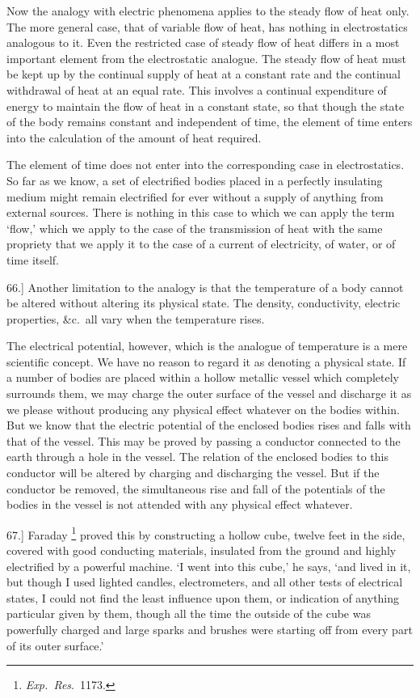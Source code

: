 \documentclass[12pt,oneside]{book}[2021/10/04]
\let\oldfootnote\footnote
\renewcommand\footnote[1]{%
\oldfootnote{\hspace{0.14em}#1}}
\newcommand{\article}[1]{\phantomsection \label{art:#1}{#1.]}}
\newcommand{\¬}{\hphantom{0}}
\begin{document}
Now the analogy with electric phenomena applies to the steady
flow of heat only. The more general case, that of variable flow of
heat, has nothing in electrostatics analogous to it. Even the restricted
case of steady flow of heat differs in a most important
element from the electrostatic analogue. The steady flow of heat
must be kept up by the continual supply of heat at a constant rate
and the continual withdrawal of heat at an equal rate. This involves
a continual expenditure of energy to maintain the flow of
heat in a constant state, so that though the state of the body
remains constant and independent of time, the element of time
enters into the calculation of the amount of heat required.

The element of time does not enter into the corresponding case
in electrostatics. So far as we know, a set of electrified bodies
placed in a perfectly insulating medium might remain electrified
for ever without a supply of anything from external sources.
There is nothing in this case to which we can apply the term
`flow,' which we apply to the case of the transmission of heat
with the same propriety that we apply it to the case of a current
of electricity, of water, or of time itself.

\article{66} Another limitation to the analogy is that the temperature
of a body cannot be altered without altering its physical state.
The density, conductivity, electric properties, \&c.\ all vary when the
temperature rises.

The electrical potential, however, which is the analogue of temperature
is a mere scientific concept. We have no reason to
regard it as denoting a physical state. If a number of bodies
are placed within a hollow metallic vessel which completely surrounds
them, we may charge the outer surface of the vessel and
discharge it as we please without producing any physical effect
whatever on the bodies within. But we know that the electric
potential of the enclosed bodies rises and falls with that of the
vessel. This may be proved by passing a conductor connected
to the earth through a hole in the vessel. The relation of the
enclosed bodies to this conductor will be altered by charging and
discharging the vessel. But if the conductor be removed, the
simultaneous rise and fall of the potentials of the bodies in the
vessel is not attended with any physical effect whatever.

\article{67} Faraday\footnote{
\textit{Exp.\ Res}.\ 1173.}
proved this by constructing a hollow cube, twelve
feet in the side, covered with good conducting materials, insulated
from the ground and highly electrified by a powerful machine.
`I went into this cube,' he says, `and lived in it, but though I
used lighted candles, electrometers, and all other tests of electrical
states, I could not find the least influence upon them, or indication
of anything particular given by them, though all the time the
outside of the cube was powerfully charged and large sparks and
brushes were starting off from every part of its outer surface.'
\end{document}
